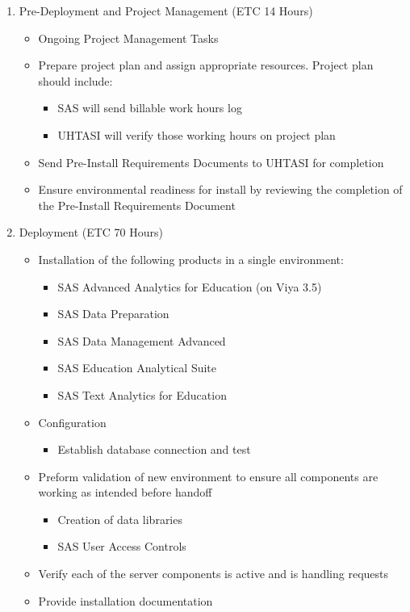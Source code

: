 \begin{enumerate} 
    \item Pre-Deployment and Project Management (ETC 14 Hours)
    \begin{itemize}
        \item Ongoing Project Management Tasks
        \item Prepare project plan and assign appropriate resources. Project plan should include: 
        \begin{itemize}
            \item SAS will send billable work hours log
            \item UHTASI will verify those working hours on project plan
        \end{itemize}
        \item Send Pre-Install Requirements Documents to UHTASI for completion
        \item Ensure environmental readiness for install by reviewing the completion of the Pre-Install Requirements Document
    \end{itemize}
    \item Deployment (ETC 70 Hours)
    \begin{itemize}
        \item Installation of the following products in a single environment:
        \begin{itemize}
            \item SAS Advanced Analytics for Education (on Viya 3.5)
            \item SAS Data Preparation
            \item SAS Data Management Advanced
            \item SAS Education Analytical Suite
            \item SAS Text Analytics for Education
        \end{itemize}
        \item Configuration
        \begin{itemize}
            \item Establish database connection and test
        \end{itemize}
        \item Preform validation of new environment to ensure all components are working as intended before handoff
        \begin{itemize}
            \item Creation of data libraries
            \item SAS User Access Controls
        \end{itemize}
        \item Verify each of the server components is active and is handling requests
        \item Provide installation documentation
    \end{itemize}
\end{enumerate}
